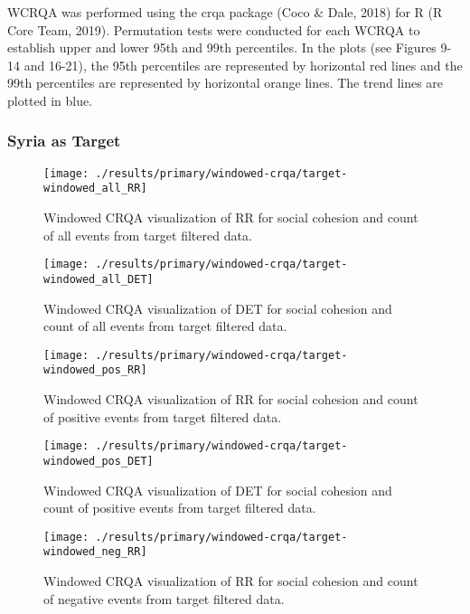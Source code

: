 \documentclass[english,man]{apa6}
\begin{document}
WCRQA was performed using the crqa package (Coco \& Dale, 2018) for R (R Core Team, 2019). Permutation tests were conducted for each WCRQA to establish upper and lower 95th and 99th percentiles. In the plots (see Figures 9-14 and 16-21), the 95th percentiles are represented by horizontal red lines and the 99th percentiles are represented by horizontal orange lines. The trend lines are plotted in blue.

\hypertarget{syria-as-target-1}{%
\subsubsection{Syria as Target}\label{syria-as-target-1}}

\begin{figure}
\texttt{[image: ./results/primary/windowed-crqa/target-windowed\_all\_RR]} \caption{Windowed CRQA visualization of RR for social cohesion and count of all events from target filtered data.}\label{fig:plot-RR-targ-all}
\end{figure}

\begin{figure}
\texttt{[image: ./results/primary/windowed-crqa/target-windowed\_all\_DET]} \caption{Windowed CRQA visualization of DET for social cohesion and count of all events from target filtered data.}\label{fig:plot-DET-targ-all}
\end{figure}

\begin{figure}
\texttt{[image: ./results/primary/windowed-crqa/target-windowed\_pos\_RR]} \caption{Windowed CRQA visualization of RR for social cohesion and count of positive events from target filtered data.}\label{fig:plot-RR-targ-pos}
\end{figure}

\begin{figure}
\texttt{[image: ./results/primary/windowed-crqa/target-windowed\_pos\_DET]} \caption{Windowed CRQA visualization of DET for social cohesion and count of positive events from target filtered data.}\label{fig:plot-DET-targ-pos}
\end{figure}

\begin{figure}
\texttt{[image: ./results/primary/windowed-crqa/target-windowed\_neg\_RR]} \caption{Windowed CRQA visualization of RR for social cohesion and count of negative events from target filtered data.}\label{fig:plot-RR-targ-neg}
\end{figure}
\end{document}
